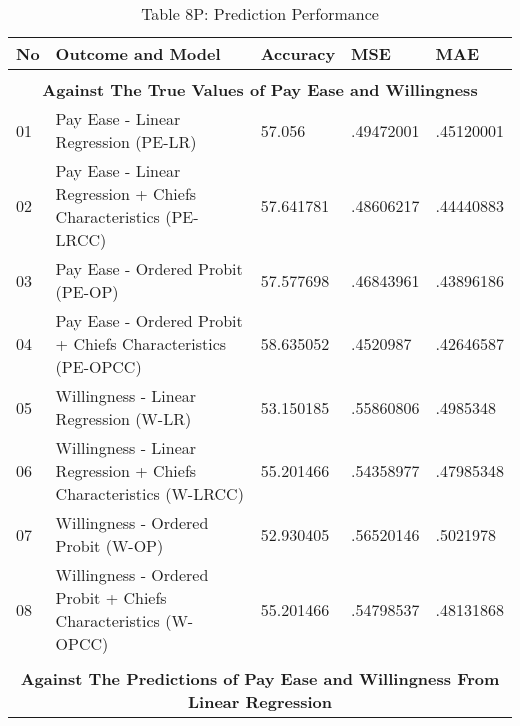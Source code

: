 \begin{table}[H]
\caption*{Table 8P: Prediction Performance}
\centering
\centerfloat
\begin{tabular}{|l|l|l|l|l|}\hline  
\textbf{No} & \textbf{Outcome and Model}& \textbf{Accuracy}  & \textbf{MSE}  & \textbf{MAE}  \\ \hline  
 \multicolumn{5}{c}{ } \\
 \multicolumn{5}{c}{\textbf{Against The True Values of Pay Ease and Willingness}} \\\hline
01&Pay Ease - Linear Regression (PE-LR)  & 57.056 & .49472001 & .45120001 \\ \hline 
02&Pay Ease - Linear Regression + Chiefs Characteristics (PE-LRCC) & 57.641781 & .48606217 & .44440883 \\ \hline 
03&Pay Ease - Ordered Probit (PE-OP) & 57.577698 & .46843961 & .43896186 \\ \hline 
04&Pay Ease - Ordered Probit + Chiefs Characteristics (PE-OPCC) & 58.635052 & .4520987 & .42646587 \\ \hline 
05&Willingness - Linear Regression (W-LR) & 53.150185 & .55860806 & .4985348 \\ \hline 
06&Willingness - Linear Regression + Chiefs Characteristics (W-LRCC)  & 55.201466 & .54358977 & .47985348 \\ \hline 
07&Willingness - Ordered Probit (W-OP)& 52.930405 & .56520146 & .5021978 \\ \hline 
08&Willingness - Ordered Probit + Chiefs Characteristics (W-OPCC) & 55.201466 & .54798537 & .48131868 \\ \hline 

 \multicolumn{5}{c}{ } \\
\multicolumn{5}{c}{\textbf{Against The Predictions of Pay Ease and Willingness  From Linear Regression }} \\\hline


\end{tabular}
\end{table}
